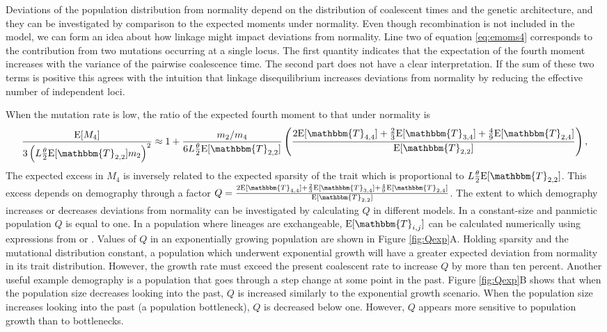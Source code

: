 
Deviations of the population distribution from normality depend on the
distribution of coalescent times and the genetic architecture, and they can be
investigated by comparison to the expected moments under normality. Even though
recombination is not included in the model, we can form an idea about how
linkage might impact deviations from normality. Line two of
equation \eqref{eq:emoms4} corresponds to the contribution from two mutations
occurring at a single locus. The first quantity indicates that the expectation
of the fourth moment increases with the variance of the pairwise coalescence
time. The second part does not have a clear interpretation. If the sum of these
two terms is positive this agrees with the intuition that linkage disequilibrium
increases deviations from normality by reducing the effective number of
independent loci.

When the mutation rate is low, the ratio of the expected fourth moment to that
under normality is
\begin{equation}
  \label{eq:popmom4coal}
  \frac{\E[M_4]}{3\left(L \T \E[\mathbbm{T}_{2,2}] m_2\right)^2} \approx 1 +
  \frac{m_2/m_4}{6 L \T \E[\mathbbm{T}_{2,2}]}\left( \frac{2\E[\mathbbm{T}_{4,4}] +
      \frac{2}{3}\E[\mathbbm{T}_{3,4}] +
      \frac{4}{9}\E[\mathbbm{T}_{2,4}]}{\E[\mathbbm{T}_{2,2}]}\right),
\end{equation}
The expected excess in $M_4$ is inversely related to the expected sparsity of
the trait which is proportional to $L \T \E[\mathbbm{T}_{2,2}]$. This excess
depends on demography through a factor $Q = \frac{2\E[\mathbbm{T}_{4,4}]
+ \frac{2}{3}\E[\mathbbm{T}_{3,4}]
+ \frac{4}{9}\E[\mathbbm{T}_{2,4}]}{\E[\mathbbm{T}_{2,2}]}$. The extent to which
demography increases or decreases deviations from normality can be investigated
by calculating $Q$ in different models. In a constant-size and panmictic
population $Q$ is equal to one. In a population where lineages are exchangeable,
$\E[\mathbbm{T}_{i,j}]$ can be calculated numerically using expressions from
\citet{Griffiths1998} or \citet{Polanski2003a}. Values of $Q$ in an exponentially growing population are
shown in Figure \ref{fig:Qexp}A. Holding sparsity and the mutational
distribution constant, a population which underwent exponential growth will have
a greater expected deviation from normality in its trait distribution. However,
the growth rate must exceed the present coalescent rate to increase $Q$ by more
than ten percent. Another useful example demography is a population that goes
through a step change at some point in the past. Figure \ref{fig:Qexp}B shows
that when the population size decreases looking into the past, $Q$ is increased
similarly to the exponential growth scenario. When the population size increases
looking into the past (a population bottleneck), $Q$ is decreased below one.
However, $Q$ appears more sensitive to population growth than to bottlenecks.

